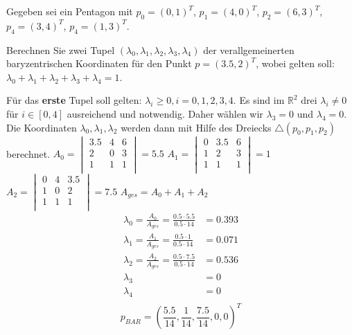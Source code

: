 \documentclass[a4paper,10pt,DIV=14]{article}
\begin{document}
Gegeben sei ein Pentagon mit $p_0 = (0, 1)^T$, $p_1 = (4, 0)^T$, $p_2 = (6, 3)^T$, $p_4 = (3, 4)^T$, $p_4 = (1, 3)^T$.

Berechnen Sie zwei Tupel $(\lambda_0, \lambda_1, \lambda_2, \lambda_3, \lambda_4)$ der verallgemeinerten baryzentrischen Koordinaten für den Punkt $p = (3.5, 2)^T$, wobei gelten soll: $\lambda_0 + \lambda_1 + \lambda_2 + \lambda_3 + \lambda_4 = 1$.

Für das \textbf{erste} Tupel soll gelten: $\lambda_i \geq 0, i = 0,1,2,3,4$.
\newline
\newline
Es sind im $\mathbb{R}^2$ drei $\lambda_i \neq 0$ f\"ur $i \in [0,4]$ ausreichend und notwendig. Daher w\"ahlen wir $\lambda_3 = 0$ und $\lambda_4 = 0$. Die Koordinaten $\lambda_0, \lambda_1, \lambda_2$ werden dann mit Hilfe des Dreiecks $\triangle(p_0, p_1, p_2)$ berechnet.
\newline
\newline
$A_0 = \begin{vmatrix}
            3.5 & 4 & 6 \\
            2 & 0 & 3 \\
            1 & 1 & 1 \\
        \end{vmatrix} = 5.5 $
        \newline
        \newline
$A_1 = \begin{vmatrix}
            0 & 3.5 & 6 \\
            1 & 2 & 3 \\
            1 & 1 & 1 \\
        \end{vmatrix} = 1 $
        \newline
        \newline
$A_2 = \begin{vmatrix}
            0 & 4 & 3.5 \\
            1 & 0 & 2 \\
            1 & 1 & 1 \\
        \end{vmatrix} = 7.5 $
        \newline
        \newline
$A_{ges} = A_0 + A_1 + A_2$
\begin{align*}
    \lambda_0 = \frac{A_0}{A_{ges}} = \frac{0.5 \cdot 5.5}{0.5 \cdot 14} & = 0.393 \\
    \lambda_1 = \frac{A_1}{A_{ges}} = \frac{0.5 \cdot 1}{0.5 \cdot 14} & = 0.071 \\
    \lambda_2 = \frac{A_2}{A_{ges}} = \frac{0.5 \cdot 7.5}{0.5 \cdot 14} & = 0.536 \\
    \lambda_3 & = 0 \\
    \lambda_4 & = 0 \\
\end{align*}
$$ p_{BAR} = \left( \frac{5.5}{14}, \frac{1}{14}, \frac{7.5}{14}, 0, 0 \right)  ^T $$
\end{document}
